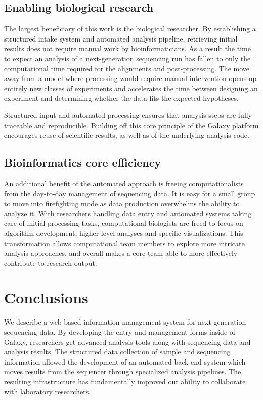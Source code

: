 \documentclass[10pt]{bmc_article}
\newenvironment{bmcformat}{\begin{raggedright}\baselineskip20pt\sloppy\setboolean{publ}{false}}{\end{raggedright}\baselineskip20pt\sloppy}
\begin{document}
\begin{bmcformat}
\subsection*{Enabling biological research}

The largest beneficiary of this work is the biological
researcher. By establishing a structured intake
system and automated analysis pipeline, retrieving initial results
does not require manual work by bioinformaticians. As a result
the time to expect an analysis of a next-generation sequencing run has
fallen to only the computational time required for the alignments and
post-processing. The move away from a model where processing would
require manual intervention opens up entirely new classes of
experiments and accelerates the time between designing an experiment
and determining whether the data fits the expected hypotheses.

Structured input and automated processing ensures that analysis steps
are fully traceable and reproducible. Building off this core principle
of the Galaxy platform encourages reuse of scientific results, as well
as of the underlying analysis code.

\subsection*{Bioinformatics core efficiency}

An additional benefit of the automated approach is freeing
computationalists from the day-to-day management of
sequencing data. It is easy for a small group to move into
firefighting mode as data production overwhelms the ability to
analyze it. With researchers handling data entry and automated systems
taking care of initial processing tasks, computational biologists are
freed to focus on algorithm development, higher level analyses and
specific visualizations. This transformation allows computational team
members to explore more intricate analysis approaches, and overall
makes a core team able to more effectively contribute to research
output.

\section*{Conclusions}

We describe a web based information management system for
next-generation sequencing data. By developing the entry and
management forms inside of Galaxy, researchers get advanced analysis
tools along with sequencing data and analysis results. The structured
data collection of sample and sequencing information allowed the
development of an automated back end system which moves results from
the sequencer through specialized analysis pipelines. The resulting
infrastructure has fundamentally improved our ability to collaborate
with laboratory researchers.


\end{bmcformat}
\end{document}
